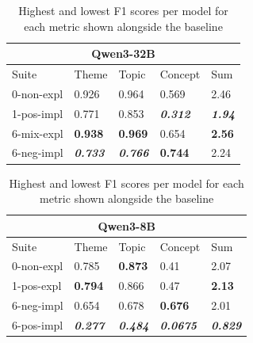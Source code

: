 \begin{table}
    \begin{tabular}{lllll}
    \toprule
    \multicolumn{5}{c}{\textbf{Qwen3-32B}} \\
    \midrule
    Suite & Theme & Topic & Concept & Sum \\
    \midrule
    0-non-expl & 0.926 & 0.964 & 0.569 & 2.46 \\
    1-pos-impl & 0.771 & 0.853 & \bfseries \itshape 0.312 & \bfseries \itshape 1.94 \\
    6-mix-expl & \bfseries 0.938 & \bfseries 0.969 & 0.654 & \bfseries 2.56 \\
    6-neg-impl & \bfseries \itshape 0.733 & \bfseries \itshape 0.766 & \bfseries 0.744 & 2.24 \\
    \bottomrule
    \end{tabular}
    \begin{tabular}{lllll}
    \toprule
    \multicolumn{5}{c}{\textbf{Qwen3-8B}} \\
    \midrule
    Suite & Theme & Topic & Concept & Sum \\
    \midrule
    0-non-expl & 0.785 & \bfseries 0.873 & 0.41 & 2.07 \\
    1-pos-expl & \bfseries 0.794 & 0.866 & 0.47 & \bfseries 2.13 \\
    6-neg-impl & 0.654 & 0.678 & \bfseries 0.676 & 2.01 \\
    6-pos-impl & \bfseries \itshape 0.277 & \bfseries \itshape 0.484 & \bfseries \itshape 0.0675 & \bfseries \itshape 0.829 \\
    \bottomrule
    \end{tabular}
    \caption{Highest and lowest F1 scores per model for each metric shown alongside the baseline}
    \label{tab:baselines_compared}
\end{table}